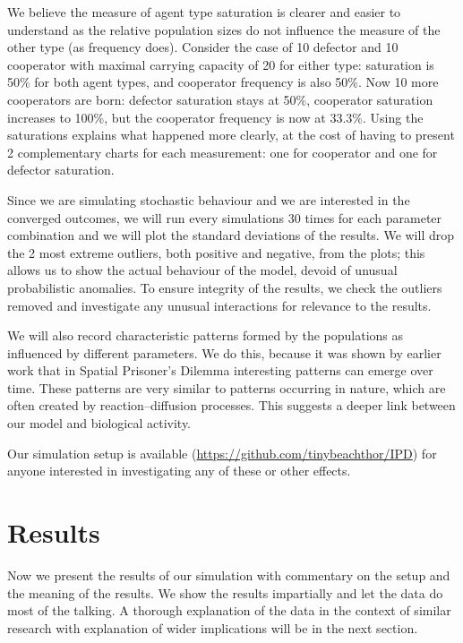 \documentclass[english]{article}
\begin{document}
We believe the measure of agent type saturation is clearer and easier to understand
as the relative population sizes do not influence the measure of the other type (as frequency does).
Consider the case of 10 defector and 10 cooperator with maximal carrying capacity of 20 for either type:
saturation is 50\% for both agent types, and cooperator frequency is also 50\%.
Now 10 more cooperators are born:
defector saturation stays at 50\%, cooperator saturation increases to 100\%,
but the cooperator frequency is now at 33.3\%.
Using the saturations explains what happened more clearly, at the cost of having to present 2 complementary charts for each measurement:
one for cooperator and one for defector saturation.

Since we are simulating stochastic behaviour and we are interested in the converged outcomes,
we will run every simulations 30 times for each parameter combination and we will plot the standard deviations of the results.
We will drop the 2 most extreme outliers, both positive and negative, from the plots; this allows us to show the actual behaviour of the model, devoid of unusual probabilistic anomalies.
To ensure integrity of the results, we check the outliers removed and investigate any unusual interactions for relevance to the results.

We will also record characteristic patterns formed by the populations as influenced by different parameters.
We do this, because it was shown by earlier work \citep{spatial-patterns} that in Spatial Prisoner's Dilemma interesting patterns can emerge over time.
These patterns are very similar to patterns occurring in nature, which are often created by reaction--diffusion processes.
This suggests a deeper link between our model and biological activity.

Our simulation setup is available
(\url{https://github.com/tinybeachthor/IPD})
for anyone interested in investigating any of these or other effects.



\section{Results}
Now we present the results of our simulation
with commentary on the setup and the meaning of the results.
We show the results impartially and let the data do most of the talking.
A thorough explanation of the data in the context of similar research
with explanation of wider implications will be in the next section.
\end{document}
